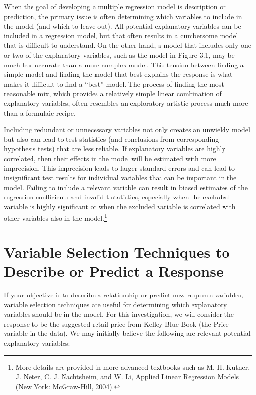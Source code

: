 \documentclass[
]{book}
\begin{document}
When the goal of developing a multiple regression model is description or prediction, the primary issue is often determining which variables to include in the model (and which to leave out). All potential explanatory variables can be included in a regression model, but that often results in a cumbersome model that is difficult to understand. On the other hand, a model that includes only one or two of the explanatory variables, such as the model in Figure 3.1, may be much less accurate than a more complex model. This tension between finding a simple model and finding the model that best explains the response is what makes it difficult to find a ``best'' model. The process of finding the most reasonable mix, which provides a relatively simple linear combination of explanatory variables, often resembles an exploratory artistic process much more than a formulaic recipe.

Including redundant or unnecessary variables not only creates an unwieldy model but also can lead to test statistics (and conclusions from corresponding hypothesis tests) that are less reliable. If explanatory variables are highly correlated, then their effects in the model will be estimated with more imprecision. This imprecision leads to larger standard errors and can lead to insignificant test results for individual variables that can be important in the model. Failing to include a relevant variable can result in biased estimates of the regression coefficients and invalid t-statistics, especially when the excluded variable is highly significant or when the excluded variable is correlated with other variables also in the model.\footnote{More details are provided in more advanced textbooks such as M. H. Kutner, J. Neter, C. J. Nachtsheim, and W. Li, Applied Linear Regression Models (New York: McGraw-Hill, 2004).}

\hypertarget{variable-selection-techniques-to-describe-or-predict-a-response}{%
\section{Variable Selection Techniques to Describe or Predict a Response}\label{variable-selection-techniques-to-describe-or-predict-a-response}}

If your objective is to describe a relationship or predict new response variables, variable selection techniques are useful for determining which explanatory variables should be in the model. For this investigation, we will consider the response to be the suggested retail price from Kelley Blue Book (the Price variable in the data). We may initially believe the following are relevant potential explanatory variables:
\end{document}
